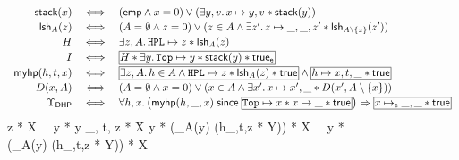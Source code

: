 

\begin{figure*}[t]
\[
\begin{array}{rcl}
  \stack(x) 
  & \iff &
  (\emp \land x = 0) \lor (\exists y,v.\, x \mapsto y,v * \stack(y))
  \\[2pt]
%
\lsh_A(z) &\iff &
(A = \emptyset \land z = 0) \lor (z \in A \land \exists z'.\,  z \mapsto \_,\_,z'  * \lsh_{A\setminus\{z\}}(z'))
\\[2pt]
  H 
  & \iff &
  \exists z,A.\, \HPL \mapsto z * \lsh_A(z) 
  \\[2pt]
%
I & \iff & \shareds{H * \exists y.\, \Top \mapsto y * \stack(y) * \true_{\se}}
\\[2pt]
\myhp(h,t,x)
  & \iff & 
  \shareds{\exists z,A.\,h \in A \land \HPL  \mapsto z * \lsh_A(z) * \true} 
                         \land 
                         \shareds{h \mapsto x,t,\_ * \true}
  \\[2pt]
D(x,A) &\iff &
(A = \emptyset \land x = 0) \lor (x \in A \land \exists x'.\,  x \mapsto x',\_
* D(x', A\setminus\{x\}))
\\[2pt]
 \Upsilon_{\textsf{DHP}} 
  & \iff &   
 \forall h,x.\, \big(\myhp(h,\_,x) \since \shareds{\Top \mapsto x * x \mapsto
   \_ * \true} \big) \Rightarrow \shareds{x \mapsto_\se \_,\_ * \true}
\end{array}
\]
\smallskip
\be
\HPL \mapsto z * X
\ \leadsto \ 
\HPL \mapsto y * y \mapsto \_, t, z * X 
\ee
\be
\HPL \mapsto y *  (\lsh_A(y) \land (h\mapsto\_,t,z * Y)) * X 
\ \leadsto \ 
\HPL \mapsto y *  (\lsh_A(y) \land (h\mapsto\_,t,z * Y)) * X 

\end{figure*}
